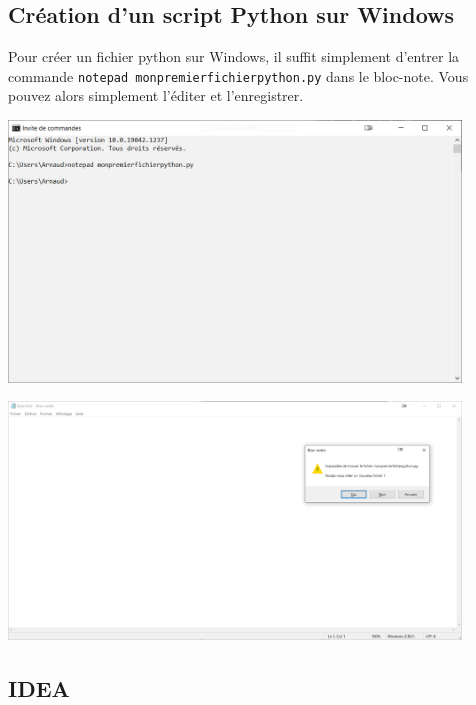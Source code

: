 \subsection{Création d'un script Python sur Windows}

Pour créer un fichier python sur Windows, il suffit simplement d'entrer la commande \lstinline{notepad monpremierfichierpython.py} dans le bloc-note. Vous pouvez alors simplement l'éditer et l'enregistrer.

\begin{center}
	\includegraphics[width=12cm]{4}	
\end{center}

\begin{center}
	\includegraphics[width=12cm]{5}	
\end{center}

\subsection{IDEA}

